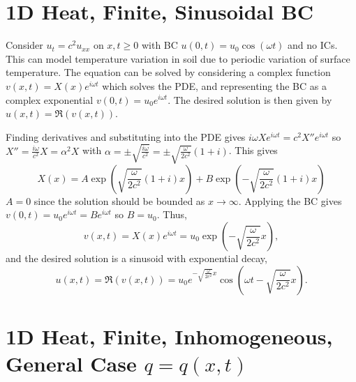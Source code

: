 \documentclass[10pt, a4paper]{article}
\begin{document}
\begin{landscape}
\begin{multicols*}{2}
    \section{1D Heat, Finite, Sinusoidal BC}

    Consider \(u_t = c^2 u_{xx}\) on \(x, t \geq 0\) with BC \(u(0, t) = u_0 \cos(\omega t)\) and no ICs.
    This can model temperature variation in soil due to periodic variation of surface temperature.
    The equation can be solved by considering a complex function \(v(x, t) = X(x) e^{i \omega t}\) which solves the PDE,
    and representing the BC as a complex exponential \(v(0, t) = u_0 e^{i \omega t}\).
    The desired solution is then given by \(u(x, t) = \Re(v(x, t))\).

    Finding derivatives and substituting into the PDE gives \(i \omega X e^{i \omega t} = c^2 X'' e^{i \omega t}\)
    so \(X'' = \frac{i \omega}{c^2} X = \alpha^2 X\) with
    \(\alpha = \pm \sqrt{\frac{i \omega}{c^2}} = \pm \sqrt{\frac{\omega}{2c^2}} (1 + i)\).
    This gives
    \[
        X(x) = A \exp\left(\sqrt{\frac{\omega}{2c^2}} (1 + i) x\right)
        + B \exp\left(-\sqrt{\frac{\omega}{2c^2}} (1 + i) x\right)
    \]
    \(A = 0\) since the solution should be bounded as \(x \to \infty\). Applying the BC gives
    \(v(0, t) = u_0 e^{i \omega t} = B e^{i \omega t}\) so \(B = u_0\).
    Thus,
    \[
        v(x, t) = X(x) e^{i \omega t} = u_0 \exp\left(-\sqrt{\frac{\omega}{2c^2}} x\right),
    \]
    and the desired solution is a sinusoid with exponential decay,
    \[
        u(x, t)
        = \Re(v(x, t))
        = u_0 e^{-\sqrt{\frac{\omega}{2c^2}} x}
        \cos \left(
            \omega t - \sqrt{\frac{\omega}{2c^2}} x
        \right).
    \]

    \section{1D Heat, Finite, Inhomogeneous, General Case \texorpdfstring{\(q = q(x, t)\)}{q = q(x, t)}}


\end{multicols*}
\end{landscape}
\end{document}
